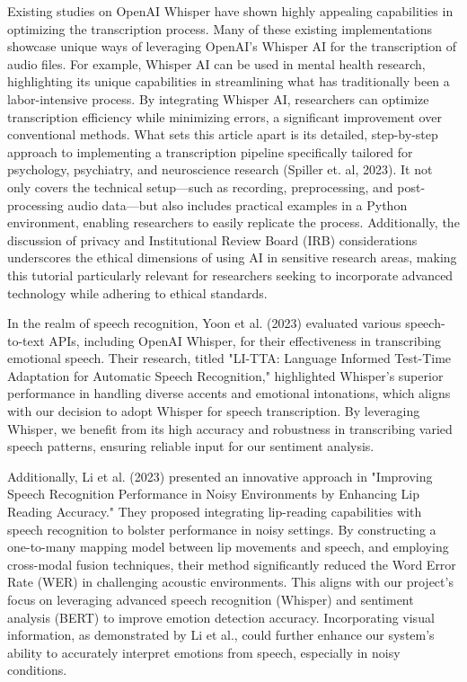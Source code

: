 \documentclass{article} %
\begin{document}
Existing studies on OpenAI Whisper have shown highly appealing capabilities in optimizing the transcription process. Many of these existing implementations showcase unique ways of leveraging OpenAI's Whisper AI for the transcription of audio files. For example, Whisper AI can be used in mental health research, highlighting its unique capabilities in streamlining what has traditionally been a labor-intensive process. By integrating Whisper AI, researchers can optimize transcription efficiency while minimizing errors, a significant improvement over conventional methods. What sets this article apart is its detailed, step-by-step approach to implementing a transcription pipeline specifically tailored for psychology, psychiatry, and neuroscience research (Spiller et. al, 2023). It not only covers the technical setup—such as recording, preprocessing, and post-processing audio data—but also includes practical examples in a Python environment, enabling researchers to easily replicate the process. Additionally, the discussion of privacy and Institutional Review Board (IRB) considerations underscores the ethical dimensions of using AI in sensitive research areas, making this tutorial particularly relevant for researchers seeking to incorporate advanced technology while adhering to ethical standards.




In the realm of speech recognition, Yoon et al. (2023) evaluated various speech-to-text APIs, including OpenAI Whisper, for their effectiveness in transcribing emotional speech. Their research, titled "LI-TTA: Language Informed Test-Time Adaptation for Automatic Speech Recognition," highlighted Whisper’s superior performance in handling diverse accents and emotional intonations, which aligns with our decision to adopt Whisper for speech transcription. By leveraging Whisper, we benefit from its high accuracy and robustness in transcribing varied speech patterns, ensuring reliable input for our sentiment analysis.



Additionally, Li et al. (2023) presented an innovative approach in "Improving Speech Recognition Performance in Noisy Environments by Enhancing Lip Reading Accuracy." They proposed integrating lip-reading capabilities with speech recognition to bolster performance in noisy settings. By constructing a one-to-many mapping model between lip movements and speech, and employing cross-modal fusion techniques, their method significantly reduced the Word Error Rate (WER) in challenging acoustic environments. This aligns with our project's focus on leveraging advanced speech recognition (Whisper) and sentiment analysis (BERT) to improve emotion detection accuracy. Incorporating visual information, as demonstrated by Li et al., could further enhance our system's ability to accurately interpret emotions from speech, especially in noisy conditions.
\end{document}

